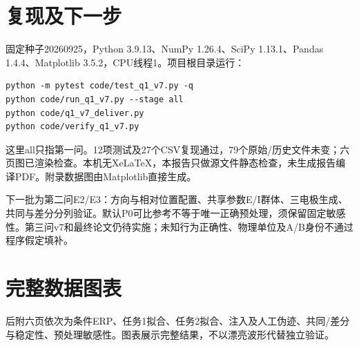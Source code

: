 \documentclass[UTF8,a4paper,11pt,fontset=fandol]{ctexart}
\begin{document}
\section{复现及下一步}
固定种子20260925，Python 3.9.13、NumPy 1.26.4、SciPy 1.13.1、Pandas 1.4.4、Matplotlib 3.5.2，CPU线程1。项目根目录运行：
\begin{verbatim}
python -m pytest code/test_q1_v7.py -q
python code/run_q1_v7.py --stage all
python code/q1_v7_deliver.py
python code/verify_q1_v7.py
\end{verbatim}
这里all只指第一问。12项测试及27个CSV复现通过，79个原始/历史文件未变；六页图已渲染检查。本机无XeLaTeX，本报告只做源文件静态检查，未生成报告编译PDF。附录数据图由Matplotlib直接生成。

下一批为第二问E2/E3：方向与相对位置配置、共享参数E/I群体、三电极生成、共同与差分分列验证。默认P0可比参考不等于唯一正确预处理，须保留固定敏感性。第三问v7和最终论文仍待实施；未知行为正确性、物理单位及A/B身份不通过程序假定填补。



\clearpage
\appendix
\section{完整数据图表}
后附六页依次为条件ERP、任务1拟合、任务2拟合、注入及人工伪迹、共同/差分与稳定性、预处理敏感性。图表展示完整结果，不以漂亮波形代替独立验证。

\end{document}
